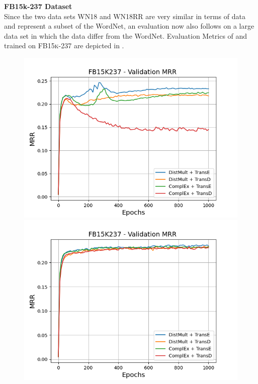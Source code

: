 \textbf{FB15k-237 Dataset}
\label{subsubsec:methods_fb15k237}\\
%
Since the two data sets WN18 and WN18RR are very similar in terms of data and represent a subset of the WordNet, an evaluation now also follows on a large data set in which the data differ from the WordNet.
Evaluation Metrics of \usmax and \ussoftmax trained on \textsc{FB15k-237} are depicted in .
\begin{figure}[H]
    \centering
    \begin{minipage}{.5\textwidth}
      \centering
      \includegraphics[width=0.9\linewidth]{figures/results/gan_train/not_pretrained/uncertainty/max/entropy/fb15k237/1k_epochs/uncertainty_fb15k237_mrrs.png}
    \end{minipage}%
    \begin{minipage}{.5\textwidth}
      \centering
      \includegraphics[width=0.9\linewidth]{figures/results/gan_train/not_pretrained/uncertainty/max_distribution/entropy/fb15k237/1k_epochs/uncertainty_fb15k237_mrrs.png}

\end{minipage}
\end{figure}
